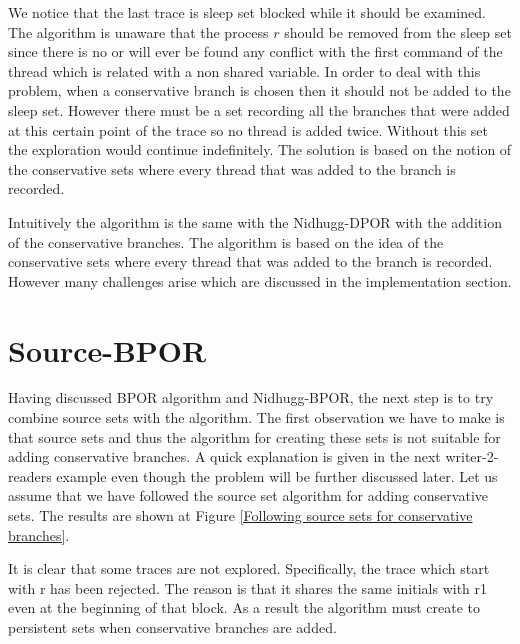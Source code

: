 
We notice that the last trace is sleep set blocked while it should be examined. The algorithm is unaware that the
process $r$ should be removed from the sleep set since there is no or will ever be found any conflict with the first
command of the thread which is related with a non shared variable. In order to deal with this problem, when a
conservative branch is chosen then it should not be added to the sleep set. However there must be a set recording all
the branches that were added at this certain point of the trace so no thread is added twice. Without this set the
exploration would continue indefinitely. The solution is based on the notion of the conservative sets where every thread
that was added to the branch is recorded. 

Intuitively the algorithm is the same with the Nidhugg-DPOR with the addition of the conservative branches. 
The algorithm is based on the idea of the conservative sets where every thread that was added to the branch is recorded.  
However many challenges arise which are discussed in the implementation section.


\section{Source-BPOR}

Having discussed BPOR algorithm and Nidhugg-BPOR, the next step is to try combine source sets with the algorithm. The
first observation we have to make is that source sets and thus the algorithm for creating these sets is not suitable for
adding conservative branches. A quick explanation is given in the next writer-2-readers example even though the problem
will be further discussed later. Let us assume that we have followed the source set algorithm for adding conservative
sets. The results are shown at Figure \ref{Following source sets for conservative branches}.


It is clear that some traces are not explored. Specifically, the trace which start with r has been rejected. The reason
is that it shares the same initials with r1 even at the beginning of that block. As a result the algorithm must create
to persistent sets when conservative branches are added. 

